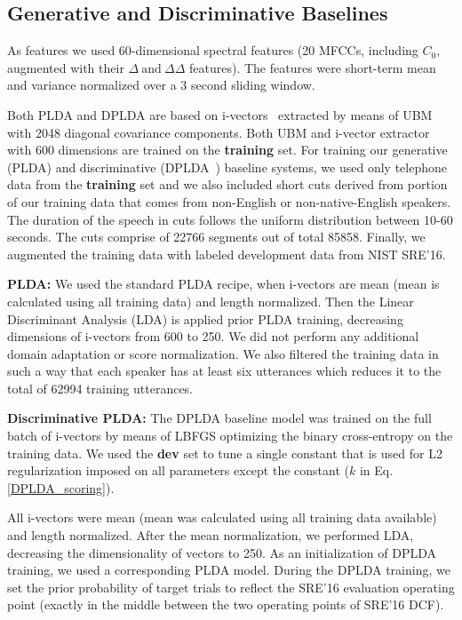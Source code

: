 \documentclass{article}
\begin{document}
\subsection{Generative and Discriminative Baselines}
\label{subsec:baseline}
As features we used 60-dimensional spectral features (20 MFCCs, including $C_0$, augmented with their \(\Delta\: \mathrm{and}\: \Delta\Delta\) features). The features were short-term mean and variance normalized over a 3 second sliding window.

Both PLDA and DPLDA are based on i-vectors~\cite{DehakN_TASLP:2011} extracted by means of UBM with 2048 diagonal covariance components. Both UBM and i-vector extractor with 600 dimensions are trained on the {\bf training} set. For training our generative (PLDA) and discriminative (DPLDA~\cite{BurgetL_ICASSP:2011}) baseline systems,  we used only telephone data from the {\bf training} set and we also included short cuts derived from portion of our training data that comes from non-English or non-native-English speakers. The duration of the speech in cuts follows the uniform distribution between 10-60 seconds. The cuts comprise of 22766 segments out of total  85858. Finally, we augmented the training data with labeled development data from NIST SRE'16.

\vspace{0.5em} \noindent\textbf{\bf PLDA:}
We used the standard PLDA recipe, when i-vectors are mean (mean is calculated using all training data) and length normalized. Then the Linear Discriminant Analysis (LDA) is applied prior PLDA training, decreasing dimensions of i-vectors from 600 to 250. We did not perform any additional domain adaptation or score normalization. We also filtered the training data in such a way that each speaker has at least six utterances which reduces it to the total of 62994 training utterances.

\vspace{0.5em} \noindent\textbf{\bf Discriminative PLDA:}
The DPLDA baseline model was trained on the full batch of i-vectors by means of LBFGS optimizing the binary cross-entropy on the training data. We used the {\bf dev} set to tune a single constant that is used for L2 regularization imposed on all parameters except the constant ($k$ in Eq. \ref{DPLDA_scoring}).

All i-vectors were mean (mean was calculated using all training data available) and length normalized. After the mean normalization, we performed LDA, decreasing the dimensionality  of vectors to 250. As an initialization of DPLDA training, we used a corresponding PLDA model. During the DPLDA training, we set the prior probability of target trials to reflect the SRE'16 evaluation operating point (exactly in the middle between the two operating points of SRE'16 DCF\cite{NIST_SRE_2016}).
\end{document}
